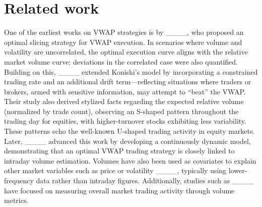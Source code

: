 \section{Related work}
One of the earliest works on VWAP strategies is by ____, who proposed an optimal slicing strategy for VWAP execution. In scenarios where volume and volatility are uncorrelated, the optimal execution curve aligns with the relative market volume curve; deviations in the correlated case were also quantified. Building on this, ____ extended Konishi’s model by incorporating a constrained trading rate and an additional drift term—reflecting situations where traders or brokers, armed with sensitive information, may attempt to “beat” the VWAP. Their study also derived stylized facts regarding the expected relative volume (normalized by trade count), observing an S-shaped pattern throughout the trading day for equities, with higher-turnover stocks exhibiting less variability. These patterns echo the well-known U-shaped trading activity in equity markets. Later, ____ advanced this work by developing a continuously dynamic model, demonstrating that an optimal VWAP trading strategy is closely linked to intraday volume estimation. Volumes have also been used as covariates to explain other market variables such as price or volatility ____, typically using lower-frequency data rather than intraday figures. Additionally, studies such as ____ have focused on measuring overall market trading activity through volume metrics.

\medskip

